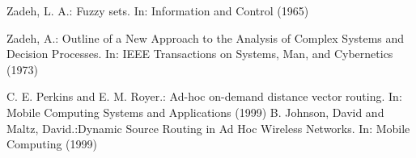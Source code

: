 \documentclass[runningheads]{llncs}
\begin{document}
\begin{thebibliography}{5}
Zadeh, L. A.: Fuzzy sets. In: Information and Control (1965)

Zadeh, A.: Outline of a New Approach to the Analysis of Complex Systems and Decision Processes. In: IEEE Transactions on Systems, Man, and Cybernetics (1973)

C. E. Perkins and E. M. Royer.: Ad-hoc on-demand distance vector routing. In: Mobile Computing Systems and Applications (1999)
B. Johnson, David and Maltz, David.:Dynamic Source Routing in Ad Hoc Wireless Networks. In: Mobile Computing (1999)



%
%

\end{thebibliography}
\end{document}
